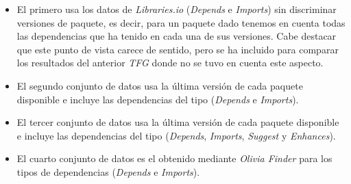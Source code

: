 \begin{itemize}
    \item El primero usa los datos de \textit{Libraries.io} (\textit{Depends} e \textit{Imports}) sin discriminar versiones de paquete, es decir, para un paquete dado tenemos en cuenta todas las dependencias que ha tenido en cada una de sus versiones. Cabe destacar que este punto de vista carece de sentido, pero se ha incluido para comparar los resultados del anterior \textit{TFG} donde no se tuvo en cuenta este aspecto.

    \item El segundo conjunto de datos usa la última versión de cada paquete disponible e incluye las dependencias del tipo (\textit{Depends} e \textit{Imports}).

    \item El tercer conjunto de datos usa la última versión de cada paquete disponible e incluye las dependencias del tipo (\textit{Depends}, \textit{Imports}, \textit{Suggest} y \textit{Enhances}).

    \item El cuarto conjunto de datos es el obtenido mediante \textit{Olivia Finder} para los tipos de dependencias (\textit{Depends} e \textit{Imports}).
\end{itemize}

